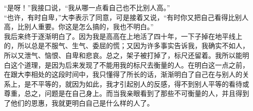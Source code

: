 “是呀！”我接口说，“我从哪一点看自己也不比别人高。”\\

“也许，有时自卑，”大李表示了同意，可是接着又说，“有时你又把自己看得比别人高，比别人重要。你这是怎么搞的，我也不明白。”\\

我后来终于逐渐明白了。因为我是高高在上地活了四十年，一下子掉在地平线上的，所以总是不服气、生气、委屈的慌；又因为许多事实告诉我，我确实不如人，所以又泄气、恼恨、自卑和悲哀。总之，架子被打掉了，标尺还留着。我所以能明白这个道理，是因为后来发现了不能用我的标尺去衡量的人。在明白这一点之前，在跟大李相处的这段时间中，我只懂得了所长的话，渐渐明白了自己在与别人的关系上，是不平等的，就因为如此，我才引起别人的反感，得不到别人平等的看待或尊重，总之，问题是在自己身上。而当我亲眼看到了那些不可衡量的人，并且得到了他们的恩惠，我就更明白自己是什么样的人了。\\